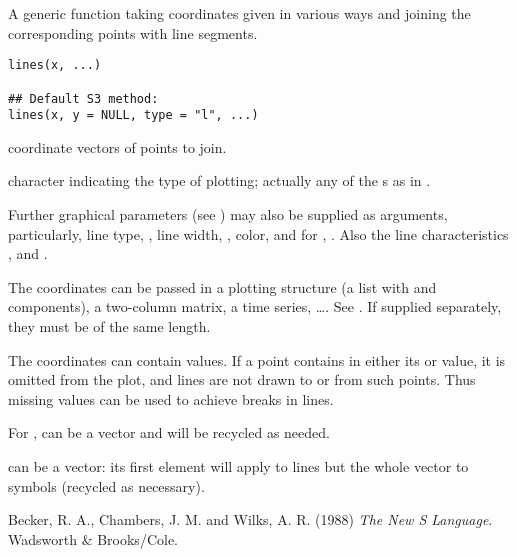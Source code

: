 %
\begin{Description}\relax
A generic function taking coordinates given in various ways and
joining the corresponding points with line segments.
\end{Description}
%
\begin{Usage}
\begin{verbatim}
lines(x, ...)

## Default S3 method:
lines(x, y = NULL, type = "l", ...)
\end{verbatim}
\end{Usage}
%
\begin{Arguments}
\begin{ldescription}
\item[\code{x, y}] coordinate vectors of points to join.
\item[\code{type}] character indicating the type of plotting; actually any of
the s as in .
\item[\code{...}] Further graphical parameters (see ) may
also be supplied as arguments, particularly, line type, ,
line width, , color,  and for ,
.  Also the line characteristics , 
and .
\end{ldescription}
\end{Arguments}
%
\begin{Details}\relax
The coordinates can be passed in a plotting structure
(a list with  and  components), a two-column matrix, a
time series, \dots.  See .  If supplied
separately, they must be of the same length.

The coordinates can contain  values. If a point contains
 in either its  or  value, it is omitted from
the plot, and lines are not drawn to or from such points.  Thus
missing values can be used to achieve breaks in lines.

For ,  can be a vector and will be recycled
as needed.

 can be a vector: its first element will apply to lines but
the whole vector to symbols (recycled as necessary).
\end{Details}
%
\begin{References}\relax
Becker, R. A., Chambers, J. M. and Wilks, A. R. (1988)
\emph{The New S Language}.
Wadsworth \& Brooks/Cole.
\end{References}
